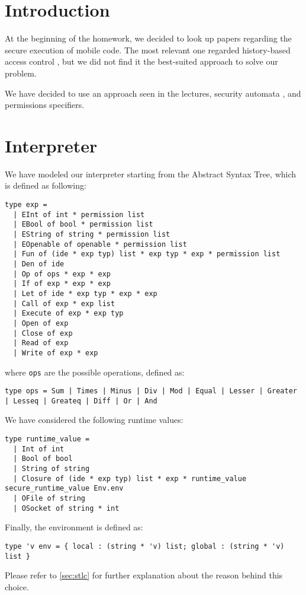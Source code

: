 \section{Introduction}
At the beginning of the homework, we decided to look up papers regarding the secure execution of mobile code. The most relevant one regarded history-based access control \cite{history-based}, but we did not find it the best-suited approach to solve our problem.

We have decided to use an approach seen in the lectures, security automata \cite{erlingsson2000sasi,10.1145/353323.353382}, and permissions specifiers.

\section{Interpreter}
We have modeled our interpreter starting from the Abstract Syntax Tree, which is defined as following:
\begin{lstlisting}
type exp =
  | EInt of int * permission list
  | EBool of bool * permission list
  | EString of string * permission list
  | EOpenable of openable * permission list
  | Fun of (ide * exp typ) list * exp typ * exp * permission list
  | Den of ide
  | Op of ops * exp * exp
  | If of exp * exp * exp
  | Let of ide * exp typ * exp * exp
  | Call of exp * exp list
  | Execute of exp * exp typ
  | Open of exp
  | Close of exp
  | Read of exp
  | Write of exp * exp
\end{lstlisting}
where \lstinline{ops} are the possible operations, defined as:
\begin{lstlisting}
type ops = Sum | Times | Minus | Div | Mod | Equal | Lesser | Greater | Lesseq | Greateq | Diff | Or | And
\end{lstlisting}
We have considered the following runtime values:
\begin{lstlisting}
type runtime_value =
  | Int of int
  | Bool of bool
  | String of string
  | Closure of (ide * exp typ) list * exp * runtime_value secure_runtime_value Env.env
  | OFile of string
  | OSocket of string * int
\end{lstlisting}
\newpage\noindent
Finally, the environment is defined as:
\begin{lstlisting}
type 'v env = { local : (string * 'v) list; global : (string * 'v) list }
\end{lstlisting}
Please refer to \cref{sec:stlc} for further explanation about the reason behind this choice.

